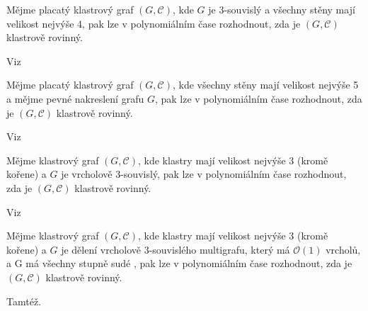 \begin{theorem}
Mějme placatý klastrový graf  $(G, \mathcal C)$, kde $G$ je 3-souvislý a všechny stěny mají velikost nejvýše 4, pak lze v polynomiálním čase rozhodnout, zda je  $(G, \mathcal C)$ klastrově rovinný.
\end{theorem}

Viz \cite{JelinkovaEtAl07}

\begin{theorem}
Mějme placatý klastrový graf  $(G, \mathcal C)$, kde všechny stěny mají velikost nejvýše 5 a mějme pevné nakreslení grafu $G$, pak lze v polynomiálním čase rozhodnout, zda je  $(G, \mathcal C)$ klastrově rovinný.
\end{theorem}

Viz \cite{DiBattistaFrati07}

\begin{theorem}
Mějme klastrový graf $(G, \mathcal C)$, kde klastry mají velikost nejvýše 3 (kromě kořene) a $G$ je vrcholově 3-souvislý, pak lze v polynomiálním čase rozhodnout, zda je  $(G, \mathcal C)$ klastrově rovinný. 
\end{theorem}

Viz \cite{JelinkovaEtAl07}

\begin{theorem}
Mějme klastrový graf $(G, \mathcal C)$, kde klastry mají velikost nejvýše 3 (kromě kořene) a $G$ je dělení vrcholově 3-souvislého multigrafu, který má $\mathcal O(1)$ vrcholů, a G má všechny stupně sudé , pak lze v polynomiálním čase rozhodnout, zda je  $(G, \mathcal C)$ klastrově rovinný. 
\end{theorem}

Tamtéž.